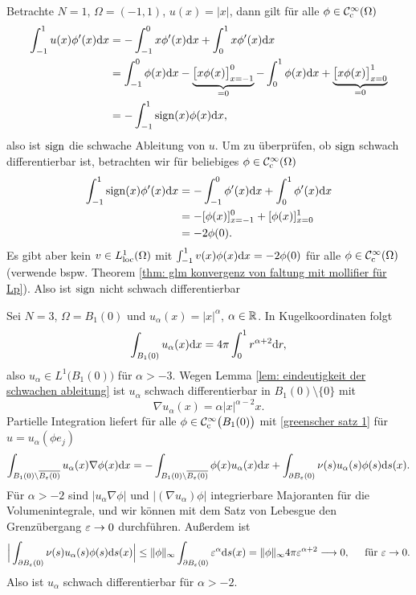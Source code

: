 \begin{bsp}
	Betrachte \(N=1\), \(\Omega=(-1,1)\), \(u(x)=|x|\), dann gilt für alle \(\phi\in\mathcal{C}_{\mathrm{c}}^\infty(\Omega)\)
	\begin{align*}
		\int_{-1}^1u(x)\phi'(x)\mathrm{d}x&=-\int_{-1}^0x\phi'(x)\mathrm{d}x+\int_0^1x\phi'(x)\mathrm{d}x\\
		&=\int_{-1}^0\phi(x)\mathrm{d}x-\underbrace{\big[x\phi(x)\big]_{x=-1}^0}_{=0}-\int_0^1\phi(x)\mathrm{d}x+\underbrace{\big[x\phi(x)\big]_{x=0}^1}_{=0}\\
		&=-\int_{-1}^1\operatorname{sign}(x)\phi(x)\mathrm{d}x,
	\end{align*}
	also ist \(\operatorname{sign}\) die schwache Ableitung von \(u\). Um zu überprüfen, ob \(\operatorname{sign}\) schwach differentierbar ist, betrachten wir für beliebiges \(\phi\in\mathcal{C}_{\mathrm{c}}^\infty(\Omega)\)
	\begin{align*}
		\int_{-1}^1\operatorname{sign}(x)\phi'(x)\mathrm{d}x
		&=-\int_{-1}^0\phi'(x)\mathrm{d}x+\int_0^1\phi'(x)\mathrm{d}x\\
		&=-[\phi(x)]_{x=-1}^0+[\phi(x)]_{x=0}^1\\
		&=-2\phi(0).
	\end{align*}
	Es gibt aber kein \(v\in L_{\mathrm{loc}}^1(\Omega)\) mit \(\int_{-1}^1v(x)\phi(x)\mathrm{d}x=-2\phi(0)\) für alle \(\phi\in\mathcal{C}_{\mathrm{c}}^\infty(\Omega)\) (verwende bspw. Theorem \ref{thm: glm konvergenz von faltung mit mollifier für Lp}). Also ist \(\operatorname{sign}\) nicht schwach differentierbar
\end{bsp}
\begin{bsp}
	Sei \(N=3\), \(\Omega=B_1(0)\) und \(u_\alpha(x)=|x|^{\alpha}\), \(\alpha\in\mathbb{R}\). In Kugelkoordinaten folgt
	\begin{equation*}
		\int_{B_1(0)}u_\alpha(x)\mathrm{d}x=4\pi\int_0^1r^{\alpha+2}\mathrm{d}r,
	\end{equation*}
	also \(u_\alpha\in L^1\big(B_1(0)\big)\) für \(\alpha>-3\). Wegen Lemma \ref{lem: eindeutigkeit der schwachen ableitung} ist \(u_\alpha\) schwach differentierbar in \(B_1(0)\setminus\{0\}\) mit
	\begin{equation*}
		\nabla u_\alpha(x)=\alpha|x|^{\alpha-2}x.
	\end{equation*}
	Partielle Integration liefert für alle \(\phi\in\mathcal{C}_{\mathrm{c}}^\infty\big(B_1(0)\big)\) mit \eqref{greenscher satz 1} für \(u=u_\alpha(\phi e_j)\)
	\begin{equation*}
		\int_{B_1(0)\setminus\overline{B_{\varepsilon}(0)}}u_\alpha(x)\nabla\phi(x)\mathrm{d}x
		=-\int_{B_1(0)\setminus\overline{B_{\varepsilon}(0)}}\phi(x) u_\alpha(x)\mathrm{d}x+\int_{\partial B_\varepsilon(0)}\nu(s)u_\alpha(s)\phi(s)\mathrm{d}s(x).
	\end{equation*}
	Für \(\alpha>-2\) sind \(|u_\alpha\nabla\phi|\) und \(|(\nabla u_\alpha)\phi|\) integrierbare Majoranten für die Volumenintegrale, und wir können mit dem Satz von Lebesgue den Grenzübergang \(\varepsilon\rightarrow0\) durchführen. Außerdem ist
	\begin{equation*}
		\Big|\int_{\partial B_\varepsilon(0)}\nu(s)u_\alpha(s)\phi(s)\mathrm{d}s(x)\Big|
		\leq\|\phi\|_\infty\int_{\partial B_\varepsilon(0)}\varepsilon^\alpha\mathrm{d}s(x)
		=\|\phi\|_\infty4\pi\varepsilon^{\alpha+2}
		\longrightarrow0,\;\;\;\;\text{ für }\varepsilon\rightarrow0.
	\end{equation*}
	Also ist \(u_\alpha\) schwach differentierbar für \(\alpha>-2\).
\end{bsp}

